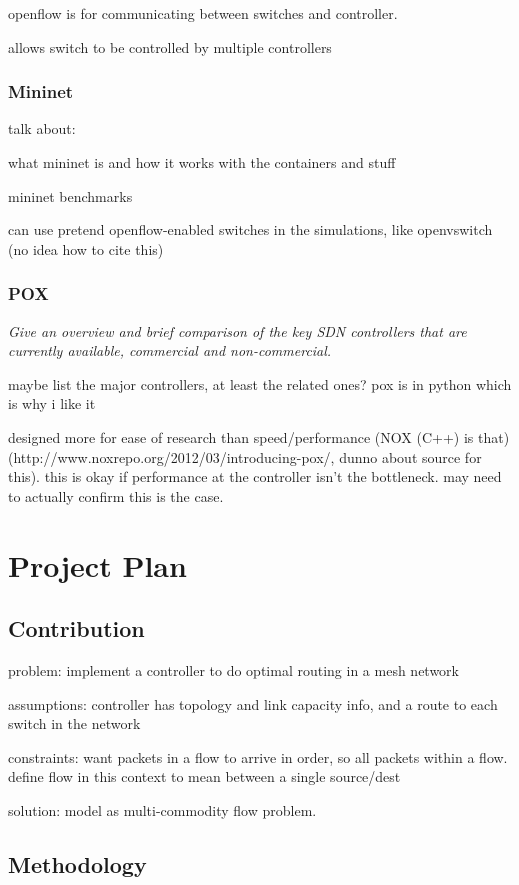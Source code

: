 \documentclass[pdftex,12pt,a4paper]{article}
\begin{document}
openflow is for communicating between switches and controller. 

allows switch to be controlled by multiple controllers \cite{mckeown:openflow}

\subsubsection{Mininet}
talk about:

what mininet is and how it works with the containers and stuff \cite{handigol:mininet}

mininet benchmarks \cite{handigol:benchmarks}

can use pretend openflow-enabled switches in the simulations, like openvswitch (no idea how to cite this)

\subsubsection{POX}
\emph{Give an overview and brief comparison of the key SDN controllers that are currently available, commercial and non-commercial.}

maybe list the major controllers, at least the related ones? pox is in python which is why i like it

designed more for ease of research than speed/performance (NOX (C++) is that) (http://www.noxrepo.org/2012/03/introducing-pox/, dunno about source for this). this is okay if performance at the controller isn't the bottleneck. may need to actually confirm this is the case.

\newpage
\section{Project Plan}
\subsection{Contribution}
problem: implement a controller to do optimal routing in a mesh network

assumptions: controller has topology and link capacity info, and a route to each switch in the network

constraints: want packets in a flow to arrive in order, so all packets within a flow. define flow in this context to mean between a single source/dest

solution: model as multi-commodity flow problem.

\subsection{Methodology}
\end{document}
